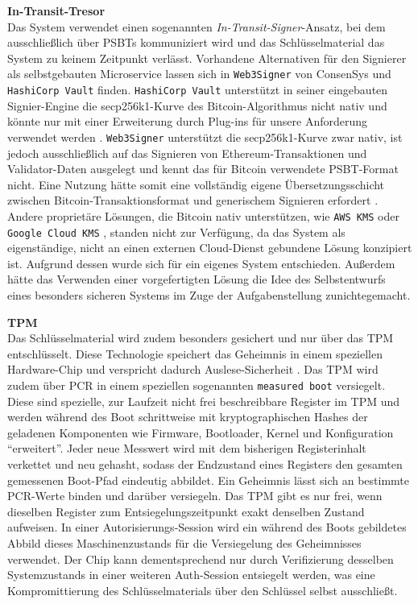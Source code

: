 \textbf{In-Transit-Tresor} \label{sec:in_transit_vault} \\
Das System verwendet einen sogenannten \emph{In-Transit-Signer}-Ansatz, bei dem ausschließlich über \acp{PSBT} kommuniziert wird und das Schlüsselmaterial das System zu keinem Zeitpunkt verlässt.
Vorhandene Alternativen für den Signierer als selbstgebauten Microservice lassen sich in \texttt{Web3Signer} von ConsenSys und \texttt{HashiCorp Vault} finden. \texttt{HashiCorp Vault} unterstützt in seiner eingebauten Signier-Engine die secp256k1-Kurve des Bitcoin-Algorithmus nicht nativ und könnte nur mit einer Erweiterung durch Plug-ins für unsere Anforderung verwendet werden \cite{vault_plugin_ethsign, vault_issue3846, sec2}.
\texttt{Web3Signer} unterstützt die secp256k1-Kurve zwar nativ, ist jedoch ausschließlich auf das Signieren von Ethereum-Transaktionen und Validator-Daten ausgelegt und kennt das für Bitcoin verwendete \ac{PSBT}-Format nicht. Eine Nutzung hätte somit eine vollständig eigene Übersetzungsschicht zwischen Bitcoin-Transaktionsformat und generischem Signieren erfordert \cite{web3signer_docs}.
Andere proprietäre Lösungen, die Bitcoin nativ unterstützen, wie \texttt{AWS KMS} oder \texttt{Google Cloud KMS} \cite{gcp_kms_algorithms}, standen nicht zur Verfügung, da das System als eigenständige, nicht an einen externen Cloud-Dienst gebundene Lösung konzipiert ist. Aufgrund dessen wurde sich für ein eigenes System entschieden. Außerdem hätte das Verwenden einer vorgefertigten Lösung die Idee des Selbstentwurfs eines besonders sicheren Systems im Zuge der Aufgabenstellung zunichtegemacht.

\textbf{TPM} \\
Das Schlüsselmaterial wird zudem besonders gesichert und nur über das \ac{TPM} entschlüsselt. Diese Technologie speichert das Geheimnis in einem speziellen Hardware-Chip und verspricht dadurch Auslese-Sicherheit \cite{TPM}.
Das \ac{TPM} wird zudem über \ac{PCR} in einem speziellen sogenannten \texttt{measured boot} versiegelt. Diese sind spezielle, zur Laufzeit nicht frei beschreibbare Register im \ac{TPM} und werden während des Boot schrittweise mit kryptographischen Hashes der geladenen Komponenten wie Firmware, Bootloader, Kernel und Konfiguration \enquote{erweitert}. Jeder neue Messwert wird mit dem bisherigen Registerinhalt verkettet und neu gehasht, sodass der Endzustand eines Registers den gesamten gemessenen Boot-Pfad eindeutig abbildet. Ein Geheimnis lässt sich an bestimmte \ac{PCR}-Werte binden und darüber versiegeln. Das \ac{TPM} gibt es nur frei, wenn dieselben Register zum Entsiegelungszeitpunkt exakt denselben Zustand aufweisen.
In einer Autorisierungs-Session wird ein während des Boots gebildetes Abbild dieses Maschinenzustands für die Versiegelung des Geheimnisses verwendet. Der Chip kann dementsprechend nur durch Verifizierung desselben Systemzustands in einer weiteren Auth-Session entsiegelt werden, was eine Kompromittierung des Schlüsselmaterials über den Schlüssel selbst ausschließt.

